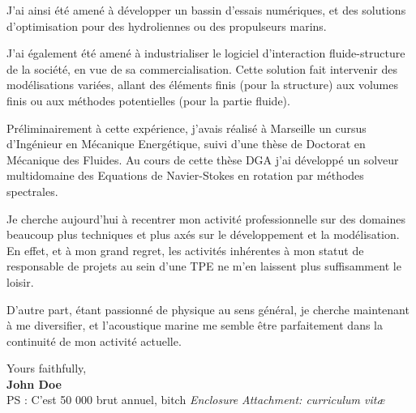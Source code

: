 \documentclass[11pt]{article}
\begin{document}
J'ai ainsi été amené à développer un bassin d'essais numériques, et des solutions d'optimisation pour des hydroliennes ou des propulseurs marins. 

J'ai également été amené à industrialiser le logiciel d'interaction fluide-structure de la société, en vue de sa commercialisation. Cette solution fait intervenir des modélisations variées, allant des éléments finis (pour la structure) aux volumes finis ou aux méthodes potentielles (pour la partie fluide).

Préliminairement à cette expérience, j'avais réalisé à Marseille un cursus d'Ingénieur en Mécanique Energétique, suivi d'une thèse de Doctorat en Mécanique des Fluides. Au cours de cette thèse DGA j'ai développé un solveur multidomaine des Equations de Navier-Stokes en rotation par méthodes spectrales.

Je cherche aujourd'hui à recentrer mon activité professionnelle sur des domaines beaucoup plus techniques et plus axés sur le développement et la modélisation. En effet, et à mon grand regret, les activités inhérentes à mon statut de responsable de projets au sein d'une TPE ne m'en laissent plus suffisamment le loisir. 

D'autre part, étant passionné de physique au sens général, je cherche maintenant à me diversifier, et l'acoustique marine me semble être parfaitement dans la continuité de mon activité actuelle.

Yours faithfully,\\[2em] %
%
{\bfseries John Doe}\\
%

PS : C'est 50 000 brut annuel, bitch
\vfill%
{\slshape Enclosure}
{\slshape Attachment: curriculum vit\ae{}}
\end{document}
